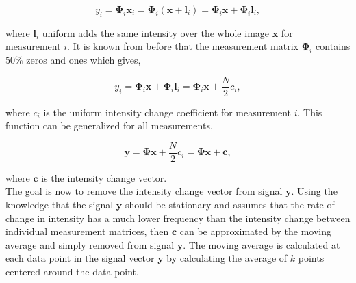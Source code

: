 \begin{equation}
y_i = \mathbf{\Phi}_i\mathbf{x}_i = \mathbf{\Phi}_i(\mathbf{x} + \mathbf{l}_i) = \mathbf{\Phi}_i\mathbf{x} + \mathbf{\Phi}_i\mathbf{l}_i ,
\end{equation}
  
where $\mathbf{l}_i$ uniform adds the same intensity over the whole image $\mathbf{x}$ for measurement $i$. It is known from before that the measurement matrix $\mathbf{\Phi}_i$ contains $50\%$ zeros and ones which gives,

\begin{equation}
y_i = \mathbf{\Phi}_i\mathbf{x} + \mathbf{\Phi}_i\mathbf{l}_i = \mathbf{\Phi}_i\mathbf{x} + \frac{N}{2}c_i,
\end{equation}

where $c_i$ is the uniform intensity change coefficient for measurement $i$. This function can be generalized for all measurements,

\begin{equation}
\mathbf{y} = \mathbf{\Phi}\mathbf{x} + \frac{N}{2}c_i = \mathbf{\Phi}\mathbf{x} + \mathbf{c},
\end{equation}

where $\mathbf{c}$ is the intensity change vector.\\[0.1in]

The goal is now to remove the intensity change vector from signal $\mathbf{y}$. Using the knowledge that the signal $\mathbf{y}$ should be stationary and assumes that the rate of change in intensity has a much lower frequency than the intensity change between individual measurement matrices, then $\mathbf{c}$ can be approximated by the moving average and simply removed from signal $\mathbf{y}$. The moving average is calculated at each data point in the signal vector $\mathbf{y}$ by calculating the average of $k$ points centered around the data point.    
		 
		 
%

